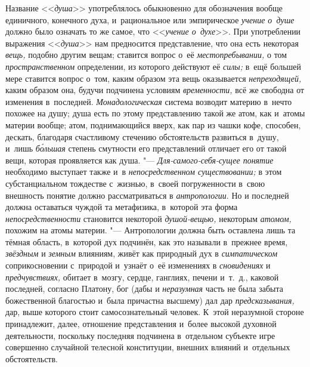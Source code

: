 Название <<{\em душа}>>
употреблялось обыкновенно для обозначения
вообще единичного, конечного духа, и~рациональное или эмпирическое
{\em учение о~душе}
должно было означать то же самое, что
<<{\em учение о~духе}>>.
При употреблении выражения
<<{\em душа}>> нам
предносится представление, что она есть некоторая
{\em вещь,} подобно
другим вещам; ставится вопрос о~её
{\em местопребывании,} о
том {\em пространственном}
определении, из которого действуют её
{\em силы;} в~ещё большей
мере ставится вопрос о~том, каким образом эта вещь оказывается
{\em непреходящей,} каким
образом она, будучи подчинена условиям
{\em временности,} всё же
свободна от изменения в~последней.
{\em Монадологическая}
система возводит материю в~нечто похожее на душу; душа есть
по этому представлению такой же атом, как и~атомы материи вообще; атом,
поднимающийся вверх, как пар из чашки кофе, способен, дескать, благодаря
счастливому стечению обстоятельств развиться в~душу, и~лишь
{\em б\'{о}льшая} степень
смутности его представлений отличает его от такой вещи, которая проявляется
как душа. "--- {\em Для-самого-себя-сущее
понятие} необходимо выступает также и~в
{\em непосредственном существовании;}
в этом субстанциальном тождестве с~жизнью, в~своей
погруженности в~свою внешность понятие должно рассматриваться в
{\em антропологии}. Но и
последней должна оставаться чуждой та метафизика, в~которой эта форма
{\em непосредственности}
становится некоторой
{\em душой-вещью,}
некоторым {\em атомом,}
похожим на атомы материи. "--- Антропологии
должна быть оставлена лишь та тёмная область, в~которой дух подчинён, как
это называли в~прежнее время,
{\em звёздным} и
{\em земным} влияниям,
живёт как природный дух в
{\em симпатическом}
соприкосновении с~природой и~узнаёт о~её изменениях в
{\em сновидениях} и
{\em предчувствиях,}
обитает в~мозгу, сердце, ганглиях, печени и~т.~д., каковой
последней, согласно Платону, бог (дабы и
{\em неразумная} часть не
была забыта божественной благостью и~была причастна высшему) дал дар
{\em предсказывания,}
дар, выше которого стоит самосознательный человек. К~этой
неразумной стороне принадлежит, далее, отношение
представления и~более высокой духовной деятельности, поскольку последняя
подчинена в~отдельном субъекте игре совершенно случайной телесной
конституции, внешних влияний и~отдельных обстоятельств.

